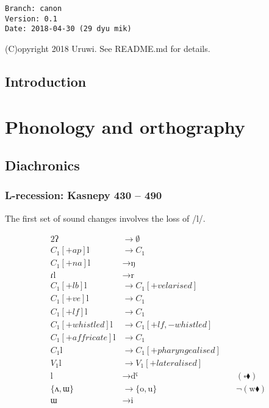 \documentclass{book}
\begin{document}
\begin{verbatim}
Branch: canon
Version: 0.1
Date: 2018-04-30 (29 dyu mik)
\end{verbatim}

(C)opyright 2018 Uruwi. See README.md for details.

\tableofcontents

\section{Introduction}

\chapter{Phonology and orthography}

\section{Diachronics}

\subsection{L-recession: Kasnepy 430 -- 490}

The first set of sound changes involves the loss of /l/.

\begin{alignat*}{2}
  \text{ʔ} &\rightarrow \emptyset \\
  C_1[+ap] \text{l} &\rightarrow C_1 \\
  C_1[+na] \text{l} &\rightarrow \text{ŋ} \\
  \text{ɾl} &\rightarrow \text{r} \\
  C_1[+lb] \text{l} &\rightarrow C_1[+velarised] \\
  C_1[+ve] \text{l} &\rightarrow C_1 \\
  C_1[+lf] \text{l} &\rightarrow C_1 \\
  C_1[+whistled] \text{l} &\rightarrow C_1[+lf, -whistled] \\
  C_1[+affricate] \text{l} &\rightarrow C_1 \\
  C_1 \text{l} &\rightarrow C_1[+pharyngealised] \\
  V_1 \text{l} &\rightarrow V_1[+lateralised] \\
  \text{l} &\rightarrow \text{dˤ}  &\quad(\square \blacklozenge) \\
  \{\text{ʌ}, \text{ɯ}\} &\rightarrow \{\text{o}, \text{u}\} &\quad \lnot(\text{w} \blacklozenge) \\
  \text{ɯ} &\rightarrow \text{i}
\end{alignat*}
\end{document}
